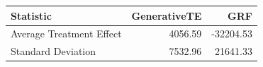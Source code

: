 \begin{tabular}{lrr}
\toprule
Statistic & GenerativeTE & GRF \\
\midrule
Average Treatment Effect & 4056.59 & -32204.53 \\
Standard Deviation & 7532.96 & 21641.33 \\
\bottomrule
\end{tabular}
